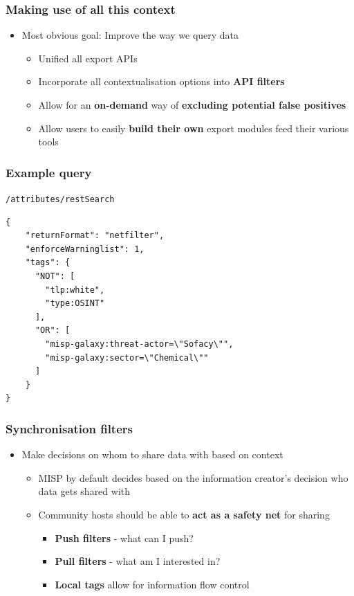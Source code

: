 \begin{frame}
  \frametitle{Making use of all this context}
  \begin{itemize}
    \item Most obvious goal: Improve the way we query data
    \begin{itemize}
      \item Unified all export APIs
      \item Incorporate all contextualisation options into {\bf API filters}
      \item Allow for an {\bf on-demand} way of {\bf excluding potential false positives}
      \item Allow users to easily {\bf build their own} export modules feed their various tools
    \end{itemize}
  \end{itemize}
\end{frame}

\begin{frame}[fragile]
    \frametitle{Example query}
    \texttt{/attributes/restSearch}
    \begin{lstlisting}
{
    "returnFormat": "netfilter",
    "enforceWarninglist": 1,
    "tags": {
      "NOT": [
        "tlp:white",
        "type:OSINT"
      ],
      "OR": [
        "misp-galaxy:threat-actor=\"Sofacy\"",
        "misp-galaxy:sector=\"Chemical\""
      ]
    }
}
    \end{lstlisting}
\end{frame}

\begin{frame}
  \frametitle{Synchronisation filters}
  \begin{itemize}
    \item Make decisions on whom to share data with based on context
    \begin{itemize}
      \item MISP by default decides based on the information creator's decision who data gets shared with
      \item Community hosts should be able to {\bf act as a safety net} for sharing
      \begin{itemize}
        \item {\bf Push filters} - what can I push?
        \item {\bf Pull filters} - what am I interested in?
        \item {\bf Local tags} allow for information flow control
      \end{itemize}
    \end{itemize}
  \end{itemize}
\end{frame}

